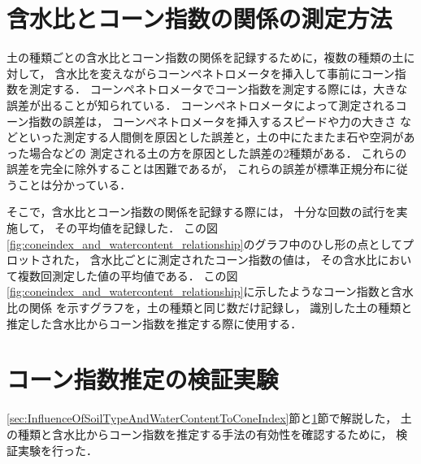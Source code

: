 \clearpage


\section{含水比とコーン指数の関係の測定方法}
\label{sec:ConeIndexEstimation}

土の種類ごとの含水比とコーン指数の関係を記録するために，複数の種類の土に対して，
含水比を変えながらコーンペネトロメータを挿入して事前にコーン指数を測定する．
コーンペネトロメータでコーン指数を測定する際には，大きな誤差が出ることが知られている．
コーンペネトロメータによって測定されるコーン指数の誤差は，
コーンペネトロメータを挿入するスピードや力の大きさ
などといった測定する人間側を原因とした誤差と，土の中にたまたま石や空洞があった場合などの
測定される土の方を原因とした誤差の2種類がある\cite{Matsuo1974}\cite{Kogure1985}．
これらの誤差を完全に除外することは困難であるが，
これらの誤差が標準正規分布に従うことは分かっている．

そこで，含水比とコーン指数の関係を記録する際には，
十分な回数の試行を実施して，
その平均値を記録した．
この図\ref{fig:coneindex_and_watercontent_relationship}のグラフ中のひし形の点としてプロットされた，
含水比ごとに測定されたコーン指数の値は，
その含水比において複数回測定した値の平均値である．
この図\ref{fig:coneindex_and_watercontent_relationship}に示したようなコーン指数と含水比の関係
を示すグラフを，土の種類と同じ数だけ記録し，
識別した土の種類と推定した含水比からコーン指数を推定する際に使用する．

\clearpage

\section{コーン指数推定の検証実験}
\label{sec:ConeindexEstimationExperiment}

\ref{sec:InfluenceOfSoilTypeAndWaterContentToConeIndex}節と\ref{sec:ConeIndexEstimation}節で解説した，
土の種類と含水比からコーン指数を推定する手法の有効性を確認するために，
検証実験を行った．


